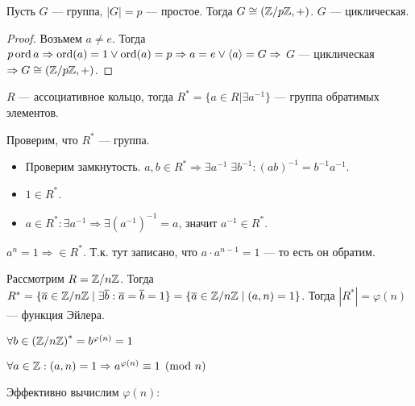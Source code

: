 \begin{remark}
    Пусть $G$ --- группа,  $|G| = p$ --- простое. Тогда  $G \cong (\mathbb{Z} / p\mathbb{Z}, +)$.  $G$ --- циклическая.
\end{remark}
\begin{proof}
    Возьмем $a \neq e$. Тогда  $p \operatorname{ord} a \Rightarrow \operatorname{ord}(a) = 1 \lor \operatorname{ord}(a) = p \Rightarrow a = e \lor \langle a \rangle = G \Rightarrow$
    $G$ --- циклическая  $\Rightarrow G \cong (\mathbb{Z} / p \mathbb{Z}, +)$. 
\end{proof}
\begin{definition}
    $R$ --- ассоциативное кольцо, тогда  $R^* = \{a \in R | \exists a^{-1}\}$ --- группа обратимых элементов.
\end{definition}
Проверим, что $R^*$ --- группа. 
 \begin{itemize}
     \item Проверим замкнутость. $a, b \in R^* \Rightarrow \exists a^{-1}\; \exists b^{-1}: (ab)^{-1} = b^{-1} a^{-1}$.
     \item  $1 \in R^*$. 
     \item $a \in R^*: \exists a^{-1} \Rightarrow \exists \left(a^{-1}\right)^{-1} = a$, значит $a^{-1} \in R^*$. 
\end{itemize}
\begin{remark}
    $a^n = 1 \Rightarrow \in R^*$. Т.к. тут записано, что  $a \cdot a^{n-1} = 1$ --- то есть он обратим.
\end{remark}
\slashn
Рассмотрим $R = \mathbb{Z} / n\mathbb{Z}$. Тогда  $R^* = \{ \overline{a} \in \mathbb{Z} / n\mathbb{Z} \mid \exists \overline{b}: \overline{a} = \overline{b} = 1\} = \{\overline{a} \in \mathbb{Z} / n\mathbb{Z} \mid (a, n) = 1\}$. Тогда $|R^*| = \varphi(n)$ --- функция Эйлера.
 \begin{theorem}
     $\forall b \in \left(\mathbb{Z} / n\mathbb{Z}\right)^* = b^{\varphi(n)} = 1$
\end{theorem}
\begin{theorem}
    $\forall a \in \mathbb{Z}: (a, n) = 1 \Rightarrow a^{\varphi(n)} \equiv 1 \pmod{n}$ 
\end{theorem}
\slashn
Эффективно вычислим $\varphi(n)$:
